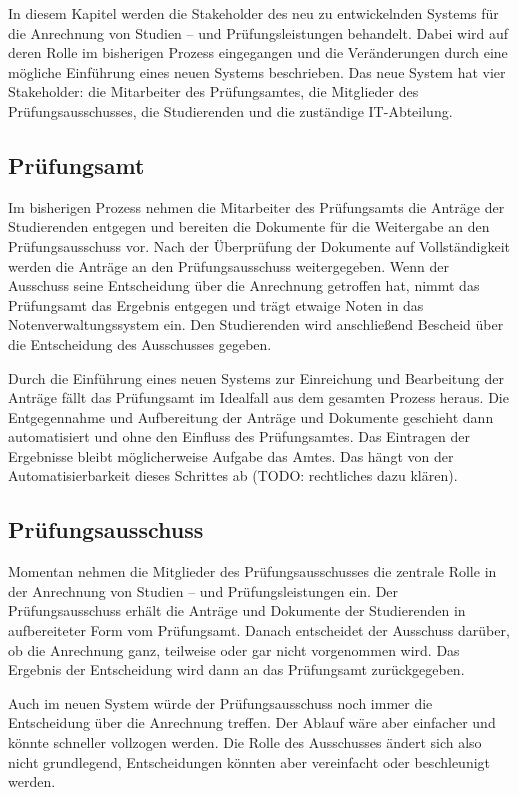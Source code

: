 \documentclass[ngerman]{tudscrreprt}
\begin{document}
In diesem Kapitel werden die Stakeholder des neu zu entwickelnden Systems für die Anrechnung von Studien – und Prüfungsleistungen behandelt. Dabei wird auf deren Rolle im bisherigen Prozess eingegangen und die Veränderungen durch eine mögliche Einführung eines neuen Systems beschrieben. Das neue System hat vier Stakeholder: die Mitarbeiter des Prüfungsamtes, die Mitglieder des Prüfungsausschusses, die Studierenden und die zuständige IT-Abteilung.


\subsection{Prüfungsamt}

Im bisherigen Prozess nehmen die Mitarbeiter des Prüfungsamts die Anträge der Studierenden entgegen und bereiten die Dokumente für die Weitergabe an den Prüfungsausschuss vor. Nach der Überprüfung der Dokumente auf Vollständigkeit werden die Anträge an den Prüfungsausschuss weitergegeben. Wenn der Ausschuss seine Entscheidung über die Anrechnung getroffen hat, nimmt das Prüfungsamt das Ergebnis entgegen und trägt etwaige Noten in das Notenverwaltungssystem ein. Den Studierenden wird anschließend Bescheid über die Entscheidung des Ausschusses gegeben.

Durch die Einführung eines neuen Systems zur Einreichung und Bearbeitung der Anträge fällt das Prüfungsamt im Idealfall aus dem gesamten Prozess heraus. Die Entgegennahme und Aufbereitung der Anträge und Dokumente geschieht dann automatisiert und ohne den Einfluss des Prüfungsamtes. Das Eintragen der Ergebnisse bleibt möglicherweise Aufgabe das Amtes. Das hängt von der Automatisierbarkeit dieses Schrittes ab (TODO: rechtliches dazu klären).

\subsection{Prüfungsausschuss}

Momentan nehmen die Mitglieder des Prüfungsausschusses die zentrale Rolle in der Anrechnung von Studien – und Prüfungsleistungen ein. Der Prüfungsausschuss erhält die Anträge und Dokumente der Studierenden in aufbereiteter Form vom Prüfungsamt. Danach entscheidet der Ausschuss darüber, ob die Anrechnung ganz, teilweise oder gar nicht vorgenommen wird. Das Ergebnis der Entscheidung wird dann an das Prüfungsamt zurückgegeben.

Auch im neuen System würde der Prüfungsausschuss noch immer die Entscheidung über die Anrechnung treffen. Der Ablauf wäre aber einfacher und könnte schneller vollzogen werden. Die Rolle des Ausschusses ändert sich also nicht grundlegend, Entscheidungen könnten aber vereinfacht oder beschleunigt werden.
\end{document}

